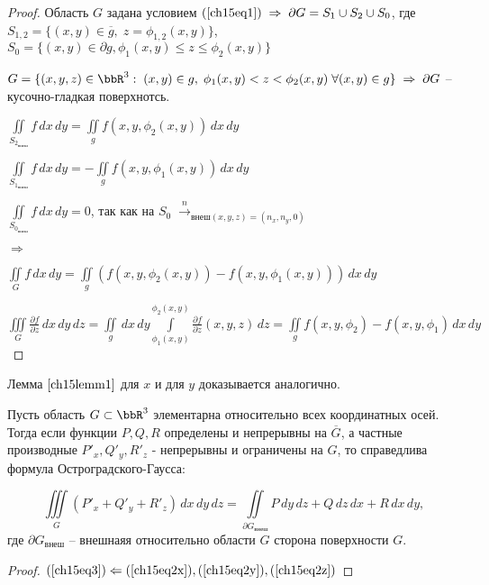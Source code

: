 \begin{proof}
Область $G$ задана условием $(\ref{ch15eq1}) \; \Rightarrow \; \partial G = S_1 \cup S_2 \cup S_0$, где $S_{1,2} = \{ (x,y) \in \overline{g}, \; z = \phi_{1,2}(x,y) \}$, $S_0 = \{ (x,y) \in \partial g, \phi_1(x,y) \le z \le \phi_2(x,y) \}$ 

$G = \{ (x,y,z) \in \bbR^3: \; (x,y) \in g, \; \phi_1(x,y) < z < \phi_2(x,y) \; \forall (x,y) \in g \} \; \Rightarrow \; \partial G$ -- кусочно-гладкая поверхнотсь.

$\iint\limits_{S_{2_{\textit{внеш}}}} f \,dx\,dy = \iint\limits_g f(x,y,\phi_2(x,y)) \,dx\,dy$

$\iint\limits_{S_{1_{\textit{внеш}}}} f \,dx\,dy = - \iint\limits_g f(x,y,\phi_1(x,y)) \,dx\,dy$

$\iint\limits_{S_{0_{\textit{внеш}}}} f \,dx\,dy = 0$, так как на $S_0 \; \overset{n}{\to}_{\textit{внеш}(x,y,z) = (n_x, n_y, 0)}$

$\Rightarrow$

$\iint\limits_G f \,dx\,dy = \iint\limits_g (f(x,y,\phi_2(x,y)) - f(x,y,\phi_1(x,y))) \,dx \,dy$

$\iiint\limits_G \frac{\partial f}{\partial z} \,dx \,dy \,dz = \iint\limits_g \,dx \,dy \int\limits_{\phi_1(x,y)}^{\phi_2(x,y)} \frac{\partial f}{\partial z}(x,y,z) \,dz = \iint\limits_g f(x,y,\phi_2) - f(x,y,\phi_1) \,dx \,dy$

\end{proof}

\begin{cons}
Лемма $\ref{ch15lemm1}$ для $x$ и для $y$ доказывается аналогично.
\end{cons}

\begin{thm} 
Пусть область $G \subset \bbR^3$ элементарна относительно всех координатных осей. Тогда если функции $P,Q,R$ определены и непрерывны на $\overline{G}$, а частные производные $P'_x, Q'_y, R'_z$ - непрерывны и ограничены на $G$, то справедлива формула Остроградского-Гаусса:

\begin{equation} \label{ch15eq3}
\iiint\limits_G (P'_x + Q'_y + R'_z) \,dx\,dy\,dz = \iint\limits_{\partial G_{\textit{внеш}}} P\,dy\,dz + Q\,dz\,dx + R\,dx\,dy,
\end{equation}
где $\partial G_{\textit{внеш}}$ -- внешнаяя относительно области $G$ сторона поверхности $G$.

\end{thm}
\begin{proof}
$(\ref{ch15eq3}) \Leftarrow (\ref{ch15eq2x}), (\ref{ch15eq2y}), (\ref{ch15eq2z})$
\end{proof}

